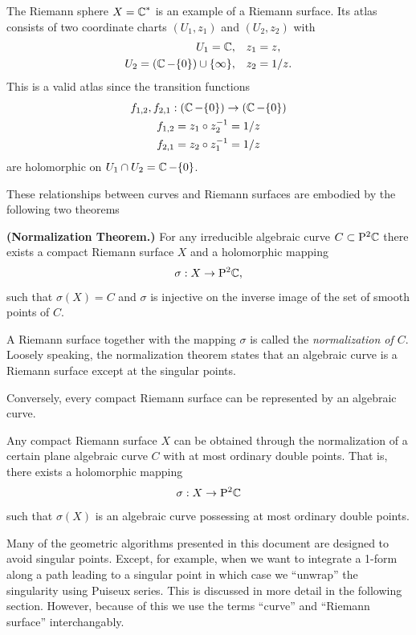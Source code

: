 The Riemann sphere $X = \operatorname{\mathbb{C}}^*$ is an example of a Riemann surface. Its atlas
consists of two coordinate charts $(U_1, z_1)$ and $(U_2, z_2)$ with
\begin{align*}
  U_1 = \operatorname{\mathbb{C}}, & \quad z_1 = z, \\
  U_2 = \left( \operatorname{\mathbb{C}} - \{0\} \right) \cup \{ \infty \}, & \quad z_2 = 1/z.
\end{align*}
This is a valid atlas since the transition functions
\begin{gather*}
  f_{1,2}, f_{2,1} : \left(\operatorname{\mathbb{C}} - \{0\}\right)
  \to \left(\operatorname{\mathbb{C}} - \{0\}\right) \\
  f_{1,2} = z_1 \circ z_2^{-1} = 1/z \\
  f_{2,1} = z_2 \circ z_1^{-1} = 1/z
\end{gather*}
are holomorphic on $U_1 \cap U_2 = \operatorname{\mathbb{C}} - \{0\}$.

These relationships between curves and Riemann surfaces are embodied by the
following two theorems %

\begin{theorem} \label{thm: normalization} {\bf (Normalization Theorem.)} For
  any irreducible algebraic curve $C \subset \mathrm{P}^2 \!\operatorname{\mathbb{C}}$ there exists a compact
  Riemann surface $X$ and a holomorphic mapping
  \[
    \sigma : X \to \mathrm{P}^2 \!\operatorname{\mathbb{C}},
  \]
  such that $\sigma( X ) = C$ and $\sigma$ is injective on the inverse image of
  the set of smooth points of $C$.
\end{theorem}

A Riemann surface together with the mapping $\sigma$ is called the {\it
  normalization of $C$}. Loosely speaking, the normalization theorem states that
an algebraic curve is a Riemann surface except at the singular points.

Conversely, every compact Riemann surface can be represented by an algebraic
curve.
\begin{theorem} \label{thm: repr-theorem} Any compact Riemann surface $X$ can be
  obtained through the normalization of a certain plane algebraic curve $C$ with
  at most ordinary double points. That is, there exists a holomorphic mapping
  \[
    \sigma : X \to \mathrm{P}^2 \!\operatorname{\mathbb{C}}
  \]
  such that $\sigma(X)$ is an algebraic curve possessing at most ordinary double
  points.
\end{theorem}
Many of the geometric algorithms presented in this document are designed to
avoid singular points. Except, for example, when we want to integrate a 1-form
along a path leading to a singular point in which case we ``unwrap'' the
singularity using Puiseux series. This is discussed in more detail in the
following section. However, because of this we use the terms ``curve'' and
``Riemann surface'' interchangably.

